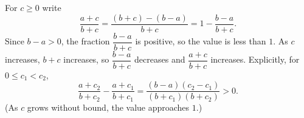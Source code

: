 For $c\ge0$ write
\[
\dfrac{a+c}{b+c}=\dfrac{(b+c)-(b-a)}{b+c}=1-\dfrac{b-a}{b+c}.
\]
Since $b-a>0$, the fraction $\dfrac{b-a}{b+c}$ is positive, so the value is less than $1$. As $c$ increases, $b+c$ increases, so $\dfrac{b-a}{b+c}$ decreases and $\dfrac{a+c}{b+c}$ increases. Explicitly, for $0\le c_1<c_2$,
\[
\dfrac{a+c_2}{b+c_2}-\dfrac{a+c_1}{b+c_1}=\dfrac{(b-a)(c_2-c_1)}{(b+c_1)(b+c_2)}>0 .
\]
(As $c$ grows without bound, the value approaches $1$.)
